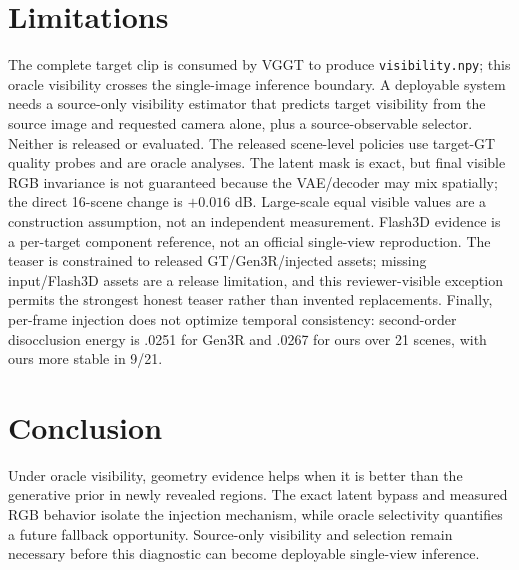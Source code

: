 \documentclass[10pt,twocolumn,letterpaper]{article}
\begin{document}
\section{Limitations}
The complete target clip is consumed by VGGT to produce \texttt{visibility.npy};
this oracle visibility crosses the single-image inference boundary. A deployable
system needs a source-only visibility estimator that predicts target visibility
from the source image and requested camera alone, plus a source-observable
selector. Neither is released or evaluated. The released scene-level policies use
target-GT quality probes and are oracle analyses. The latent mask is exact, but
final visible RGB invariance is not guaranteed because the VAE/decoder may mix
spatially; the direct 16-scene change is $+0.016$ dB. Large-scale equal visible
values are a construction assumption, not an independent measurement. Flash3D
evidence is a per-target component reference, not an official single-view reproduction. The teaser is constrained to released
GT/Gen3R/injected assets; missing input/Flash3D assets are a release limitation,
and this reviewer-visible exception permits the strongest honest teaser rather
than invented replacements. Finally, per-frame injection does not optimize temporal
consistency: second-order disocclusion energy is .0251 for Gen3R and .0267 for
ours over 21 scenes, with ours more stable in 9/21.

\section{Conclusion}
Under oracle visibility, geometry evidence helps when it is better than the
generative prior in newly revealed regions. The exact latent bypass and measured
RGB behavior isolate the injection mechanism, while oracle selectivity quantifies
a future fallback opportunity. Source-only visibility and selection remain
necessary before this diagnostic can become deployable single-view inference.

{\small


}
\end{document}
